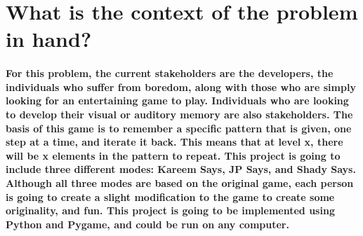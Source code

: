 \documentclass{article}
\begin{document}
\section{What is the context of the problem in hand?}

\paragraph{For this problem, the current stakeholders are the developers, the individuals who suffer from boredom, along with those who are simply looking for an entertaining game to play. Individuals who are looking to develop their visual or auditory memory are also stakeholders. The basis of this game is to remember a specific pattern that is given, one step at a time, and iterate it back. This means that at level x, there will be x elements in the pattern to repeat. This project is going to include three different modes: Kareem Says, JP Says, and Shady Says. Although all three modes are based on the original game, each person is going to create a slight modification to the game to create some originality, and fun. This project is going to be implemented using Python and Pygame, and could be run on any computer.}
\end{document}
